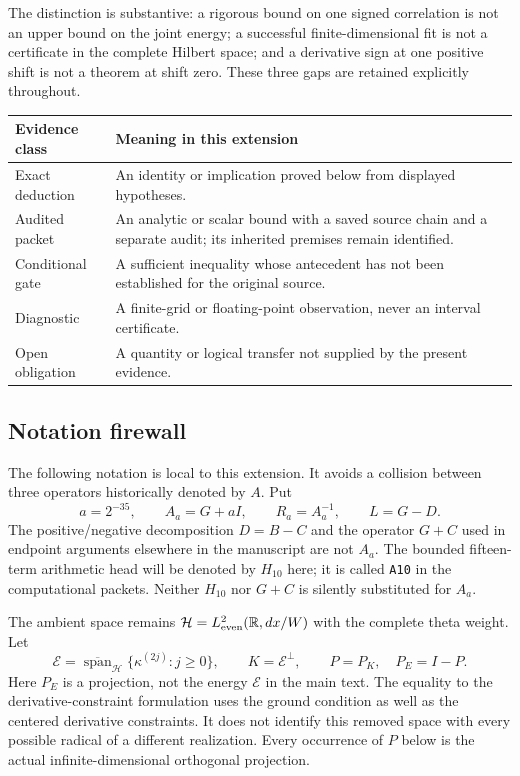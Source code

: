 \documentclass[11pt,a4paper]{article}
\numberwithin{equation}{section}
\theoremstyle{definition}\newtheorem{definition}[theorem]{Definition}
\theoremstyle{remark}\newtheorem{remark}[theorem]{Remark}
\newcommand{\R}{\mathbb R}\newcommand{\C}{\mathbb C}\newcommand{\N}{\mathbb N}
\newcommand{\E}{\mathcal E}\newcommand{\D}{\mathcal D}
\newcommand{\Hh}{\mathcal H}\newcommand{\Hw}{\mathcal H}
\begin{document}
The distinction is substantive: a rigorous bound on one signed correlation is not an upper bound on the joint energy; a successful finite-dimensional fit is not a certificate in the complete Hilbert space; and a derivative sign at one positive shift is not a theorem at shift zero. These three gaps are retained explicitly throughout.

\begin{center}\small
\begin{tabularx}{\textwidth}{@{}p{}X@{}}\toprule
Evidence class & Meaning in this extension\\\midrule
Exact deduction & An identity or implication proved below from displayed hypotheses.\\
Audited packet & An analytic or scalar bound with a saved source chain and a separate audit; its inherited premises remain identified.\\
Conditional gate & A sufficient inequality whose antecedent has not been established for the original source.\\
Diagnostic & A finite-grid or floating-point observation, never an interval certificate.\\
Open obligation & A quantity or logical transfer not supplied by the present evidence.\\\bottomrule
\end{tabularx}\end{center}

\subsection{Notation firewall}
The following notation is local to this extension. It avoids a collision between three operators historically denoted by $A$. Put
\[
 a=2^{-35},\qquad A_a=G+aI,\qquad R_a=A_a^{-1},
 \qquad L=G-D.
\]
The positive/negative decomposition $D=B-C$ and the operator $G+C$ used in endpoint arguments elsewhere in the manuscript are not $A_a$. The bounded fifteen-term arithmetic head will be denoted by $H_{10}$ here; it is called \texttt{A10} in the computational packets. Neither $H_{10}$ nor $G+C$ is silently substituted for $A_a$.

The ambient space remains $\Hh=L^2_{\rm even}(\R,dx/W)$ with the complete theta weight. Let
\[
 \mathscr E=\overline{\operatorname{span}}_{\Hh}\{\kappa^{(2j)}:j\geq0\},
 \qquad K=\mathscr E^\perp,
 \qquad P=P_K,\quad P_E=I-P.
\]
Here $P_E$ is a projection, not the energy $\E$ in the main text. The equality to the derivative-constraint formulation uses the ground condition as well as the centered derivative constraints. It does not identify this removed space with every possible radical of a different realization. Every occurrence of $P$ below is the actual infinite-dimensional orthogonal projection.
\end{document}
